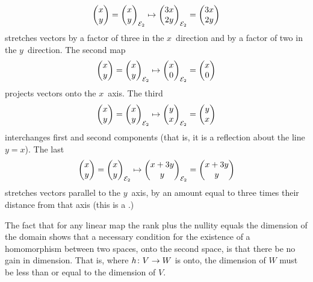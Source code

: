 \begin{exercises}
\begin{answer}
\begin{equation*}
        \begin{pmatrix} x \\ y \end{pmatrix}=\begin{pmatrix} x \\ y \end{pmatrix}_{{\cal E}_2}
        \mapsto
        \begin{pmatrix} 3x \\ 2y \end{pmatrix}_{{\cal E}_2}=\begin{pmatrix} 3x \\ 2y \end{pmatrix}
      \end{equation*}
      stretches vectors by a factor of three in the
      \( x \)~direction and by a factor of two in the \( y \)~direction.
      The second map
      \begin{equation*}
        \begin{pmatrix} x \\ y \end{pmatrix}=\begin{pmatrix} x \\ y \end{pmatrix}_{{\cal E}_2}
        \mapsto
        \begin{pmatrix} x \\ 0 \end{pmatrix}_{{\cal E}_2}=\begin{pmatrix} x \\ 0 \end{pmatrix}
      \end{equation*}
      projects vectors onto the \( x \)~axis.
      The third 
      \begin{equation*}
        \begin{pmatrix} x \\ y \end{pmatrix}=\begin{pmatrix} x \\ y \end{pmatrix}_{{\cal E}_2}
        \mapsto
        \begin{pmatrix} y \\ x \end{pmatrix}_{{\cal E}_2}=\begin{pmatrix} y \\ x \end{pmatrix}
      \end{equation*}
      interchanges first and second components
      (that is, it is a reflection about the line \( y=x \)).
      The last 
      \begin{equation*}
        \begin{pmatrix} x \\ y \end{pmatrix}=\begin{pmatrix} x \\ y \end{pmatrix}_{{\cal E}_2}
        \mapsto
        \begin{pmatrix} x+3y \\ y \end{pmatrix}_{{\cal E}_2}=\begin{pmatrix} x+3y \\ y \end{pmatrix}
      \end{equation*}
      stretches vectors parallel to the \( y \)~axis, by an amount
      equal to three times their distance from that axis 
      (this is a .)  
     \end{answer}
  \item 
     The fact that for any linear map the rank plus the nullity
     equals the dimension of the domain shows that a necessary
     condition for the existence of a homomorphism between two spaces, onto
     the second space, is that there be no gain in dimension.
     That is, where $\mbox{$h\colon V\to W$}$ is onto, the dimension of $W$ must
     be less than or equal to the dimension of $V$.
     \begin{exparts}

\end{exparts}
\end{exercises}

